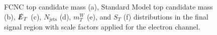 \begin{figure}[]
\hfil  %
\caption{FCNC top candidate mass (a), Standard Model top candidate mass (b), $\slashed{E}_T$ (c), $N_\text{jets}$ (d),  $m_T^W$ (e), and $S_T$ (f) distributions in the final signal region with scale factors applied for the electron channel.}
\label{fig:SRej2}
\end{figure}


